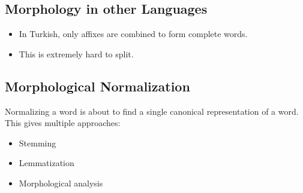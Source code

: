 \documentclass[a4paper, 11pt, accentcolor = tud3b]{tudreport}
\begin{document}
            \subsection{Morphology in other Languages} %
                \begin{itemize}
                	\item In Turkish, only affixes are combined to form complete words.
                	\item This is extremely hard to split.
                \end{itemize}

            \subsection{Morphological Normalization} %
                Normalizing a word is about to find a single canonical representation of a word. This gives multiple approaches:
                \begin{itemize}
                	\item Stemming
                	\item Lemmatization
                	\item Morphological analysis
                \end{itemize}
\end{document}

